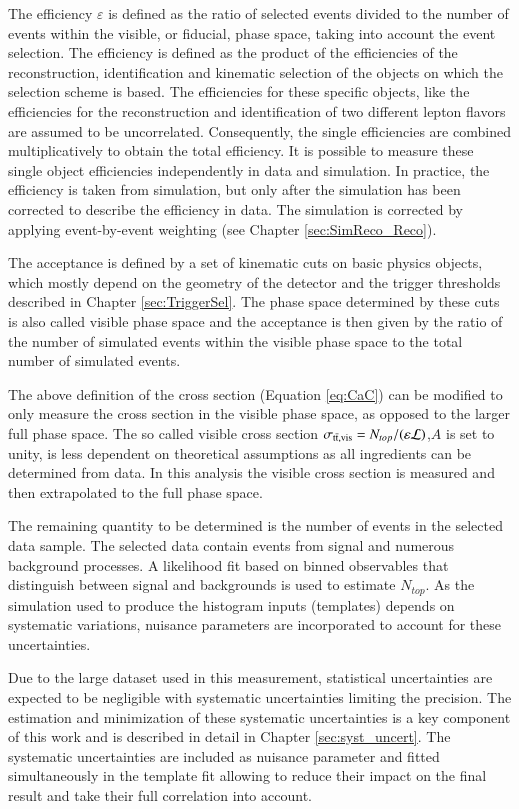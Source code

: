 The efficiency $\varepsilon$ is defined as the ratio of selected \ttbar events divided to the number of \ttbar events within the visible, or fiducial, phase space, taking into account the event selection. The efficiency is defined as the product of the efficiencies of the reconstruction, identification and kinematic selection of the objects on which the selection scheme is based.
The efficiencies for these specific objects, like the
efficiencies for the reconstruction and identification of two different lepton flavors are assumed to be uncorrelated. Consequently, the single efficiencies are combined multiplicatively to obtain the total efficiency.
It is possible to measure these single object efficiencies independently in data and simulation.
In practice, the efficiency is taken from simulation, but only after the simulation has been corrected to describe the efficiency in data. The simulation is corrected by applying event-by-event weighting (see Chapter \ref{sec:SimReco_Reco}).

The acceptance is defined by a set of kinematic cuts on basic physics objects, which mostly depend on the geometry of the detector and the trigger thresholds described in Chapter \ref{sec:TriggerSel}.
The phase space determined by these cuts is also called visible phase space and the acceptance is then given by the ratio of the number of simulated \ttbar events within the visible phase space to the total number of simulated \ttbar events. 

The above definition of the cross section (Equation \ref{eq:CaC}) can be modified to only measure the cross section in the visible phase space, as opposed to the larger full phase space. The so called visible cross section $\sigma_{\mathrm{t}\bar{\mathrm{t}},\mathrm{vis}} = N_{top} /(\varepsilon \mathcal{L})$,\ie $A$ is set to unity, is less dependent on theoretical assumptions as all ingredients can be determined from data.
In this analysis the visible cross section is measured and then extrapolated to the full phase space.

The remaining quantity to be determined is the number of \ttbar events in the selected data sample. The selected data contain events from signal and numerous background processes. A likelihood fit based on binned 
observables that distinguish between signal and backgrounds is used to estimate $N_{top}$. As the simulation used to produce the histogram inputs (templates) depends on systematic variations, nuisance parameters are incorporated to account for these uncertainties.

Due to the large dataset used in this measurement, statistical uncertainties are expected to be negligible with systematic uncertainties limiting the precision. The estimation and minimization of these systematic uncertainties 
is a key component of this work and is described in detail in Chapter \ref{sec:syst_uncert}.
The systematic uncertainties are included as nuisance parameter and fitted simultaneously in the template fit allowing to reduce their impact on the final result and take their full correlation into account.

